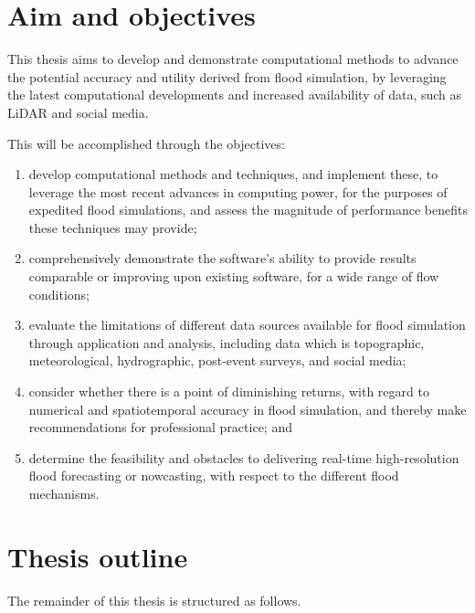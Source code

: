 \section{Aim and objectives}

This thesis aims to develop and demonstrate computational methods to advance the potential accuracy and utility derived from flood simulation, by leveraging the latest computational developments and increased availability of data, such as LiDAR and social media.

This will be accomplished through the objectives:
\begin{enumerate}
	\item develop computational methods and techniques, and implement these, to leverage the most recent advances in computing power, for the purposes of expedited flood simulations, and assess the magnitude of performance benefits these techniques may provide;
	\item comprehensively demonstrate the software's ability to provide results comparable or improving upon existing software, for a wide range of flow conditions;
	\item evaluate the limitations of different data sources available for flood simulation through application and analysis, including data which is topographic, meteorological, hydrographic, post-event surveys, and social media;
	\item consider whether there is a point of diminishing returns, with regard to numerical and spatiotemporal accuracy in flood simulation, and thereby make recommendations for professional practice; and
	\item determine the feasibility and obstacles to delivering real-time high-resolution flood forecasting or nowcasting, with respect to the different flood mechanisms.
\end{enumerate}

\section{Thesis outline}

The remainder of this thesis is structured as follows.

